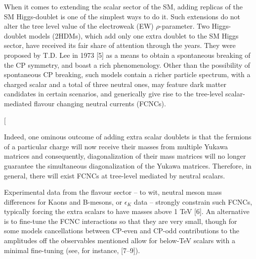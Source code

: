 \documentclass[11pt]{article}
\begin{document}
When it comes to extending the scalar sector of the SM, adding replicas of the SM Higgs-doublet is one of the simplest ways to do it. Such extensions do not alter the tree level value of the electroweak (EW) $\rho$-parameter. Two Higgs-doublet models (2HDMs), which add only one extra doublet to the SM Higgs sector, have received its fair share of attention through the years. They were proposed by T.D. Lee in 1973 [5] as a means to obtain a spontaneous breaking of the CP symmetry, and boast a rich phenomenology. 
%
Other than the possibility of spontaneous CP breaking, such models contain a richer particle spectrum, with a charged scalar and a total of three neutral ones, may feature dark matter candidates in certain scenarios, and generically give rise to the tree-level scalar-mediated flavour changing neutral currents (FCNCs).

[%

Indeed, one ominous outcome of adding extra scalar doublets is that the fermions of a particular charge will now receive their masses from
multiple Yukawa matrices and consequently, diagonalization of their mass matrices will no longer guarantee the simultaneous diagonalization of the Yukawa matrices. Therefore, in general, there will exist FCNCs at tree-level mediated by neutral scalars.


Experimental data from the flavour sector {\color{red}– to wit}, neutral meson mass differences for Kaons and B-mesons, or $\epsilon_K$ data – strongly constrain such FCNCs, typically forcing the extra scalars to have masses above 1 TeV [6].
%
An alternative is to fine-tune the FCNC interactions so that they are very small, though for some models cancellations between CP-even and CP-odd contributions to the amplitudes off the observables mentioned allow for below-TeV scalars with a minimal fine-tuning (see, for instance, [7–9]).
%
%
\end{document}

